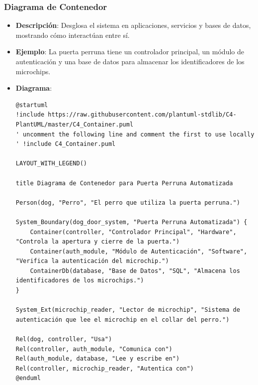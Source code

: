 \subsubsection{Diagrama de Contenedor}
\begin{itemize}
    \item \textbf{Descripción}: Desglosa el sistema en aplicaciones, servicios y bases de datos, mostrando cómo interactúan entre sí.
    \item \textbf{Ejemplo}: La puerta perruna tiene un controlador principal, un módulo de autenticación y una base de datos para almacenar los identificadores de los microchips.
    \item \textbf{Diagrama}:
\begin{verbatim}
@startuml
!include https://raw.githubusercontent.com/plantuml-stdlib/C4-PlantUML/master/C4_Container.puml
' uncomment the following line and comment the first to use locally
' !include C4_Container.puml

LAYOUT_WITH_LEGEND()

title Diagrama de Contenedor para Puerta Perruna Automatizada

Person(dog, "Perro", "El perro que utiliza la puerta perruna.")

System_Boundary(dog_door_system, "Puerta Perruna Automatizada") {
    Container(controller, "Controlador Principal", "Hardware", "Controla la apertura y cierre de la puerta.")
    Container(auth_module, "Módulo de Autenticación", "Software", "Verifica la autenticación del microchip.")
    ContainerDb(database, "Base de Datos", "SQL", "Almacena los identificadores de los microchips.")
}

System_Ext(microchip_reader, "Lector de microchip", "Sistema de autenticación que lee el microchip en el collar del perro.")

Rel(dog, controller, "Usa")
Rel(controller, auth_module, "Comunica con")
Rel(auth_module, database, "Lee y escribe en")
Rel(controller, microchip_reader, "Autentica con")
@enduml

\end{verbatim}
\end{itemize}

